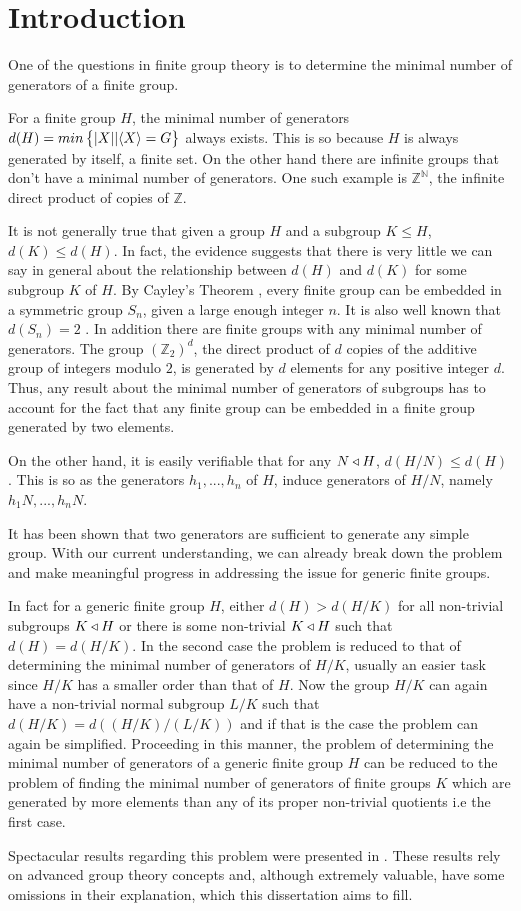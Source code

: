 \chapter*{Introduction}
One of the questions in finite group theory is to determine the minimal number of generators of a finite group.

For a finite group $H$, the minimal number of generators $d(H) = min\left\{| X ||\langle X \rangle = G \right\}$ always exists. This is so because $H$ is always generated by itself, a finite set. On the other hand there are infinite groups that don't have a minimal number of generators. One such example is $\mathbb{Z}^{\mathbb{N}}$, the infinite direct product of copies of $\mathbb{Z}$.

It is not generally true that given a group $H$ and a subgroup $K \le H$, $d(K) \le d(H)$. 
In fact, the evidence suggests that there is very little we can say in general about the relationship between $d(H)$ and $d(K)$ for some subgroup $K$ of $H$. By Cayley's Theorem \cite[p.~52]{RotmanITG}, every finite group can be embedded in a symmetric group $S_n$, given a large enough integer $n$. It is also well known that $d(S_n) = 2$ \cite[p.~24]{RotmanITG}. In addition there are finite groups with any minimal number of generators. The group $(\mathbb{Z}_2)^d$, the direct product of $d$ copies of the additive group of integers modulo $2$, is generated by $d$ elements for any positive integer $d$. Thus, any result about the minimal number of generators of subgroups has to account for the fact that any finite group can be embedded in a finite group generated by two elements.

On the other hand, it is easily verifiable that for any $N \triangleleft H$, $d(H/N) \le d(H)$. 
This is so as the generators $h_1,...,h_n$ of $H$, induce generators of $H/N$, namely $h_1N, ..., h_nN$.


It has been shown \cite{AschbacherSAFCG} that two generators are sufficient to generate any simple group.
With our current understanding, we can already break down the problem and make meaningful progress in addressing the issue for generic finite groups.

In fact for a generic finite group $H$, either $d(H) > d(H/K)$ for all non-trivial subgroups $K \triangleleft H$ or there is some non-trivial $K \triangleleft H$ such that $d(H) = d(H/K)$. In the second case the problem is reduced to that of determining the minimal number of generators of $H/K$, usually an easier task since $H/K$ has a smaller order than that of $H$. Now the group $H/K$ can again have a non-trivial normal subgroup $L/K$ such that $d(H/K) = d((H/K)/(L/K))$ and if that is the case the problem can again be simplified. Proceeding in this manner, the problem of determining the minimal number of generators of a generic finite group $H$ can be reduced to the problem of finding the minimal number of generators of finite groups $K$ which are generated by more elements than any of its proper non-trivial quotients i.e the first case.

Spectacular results regarding this problem were presented in \cite{DallaVoltaFGNMGAPQ}. These results rely on advanced group theory concepts and, although extremely valuable, have some omissions in their explanation, which this dissertation aims to fill.
